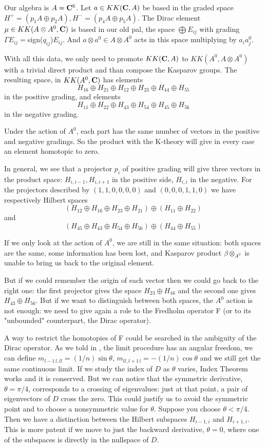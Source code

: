 \documentclass[a4paper,10pt]{article}
\begin{document}
Our algebra is $A={\bf C}^6$. Let $a \in KK({\bf C},A)$ be based in the graded space
$H^+=(p_1 A\oplus p_2A), H^-=(p_4A\oplus p_5A)$. The Dirac element 
$\mu \in KK(A\otimes A^0,{\bf C})$ is based in our old pal\cite{previous}, the 
space $\bigoplus E_{ij}$ with grading $\Gamma E_{ij}=$sign($q_{ij}$)$E_{ij}$.
And $a\otimes a^0 \in A\otimes A^0$ acts in this space
multiplying by $a_i a^0_j$.

With all this data, we only need to promote $KK({\bf C},A)$ to 
$KK(A^0, A\otimes A^0)$ with a trivial direct product and than compose
the Kasparov groups. The resulting space, in $KK(A^0,{\bf C})$ has elements
$$H_{16}\oplus H_{21}\oplus H_{12}\oplus H_{23}\oplus H_{44} \oplus H_{55}
$$ in the positive grading, and elements
$$H_{11}\oplus H_{22}\oplus H_{43}\oplus H_{54}\oplus H_{45} \oplus H_{56}
$$ in the negative grading. 

Under the action of $A^0$, each part has the same number of vectors in the
positive and negative gradings. So the product with the K-theory will give
in every case an element homotopic to zero. 

In general, we see that a projector $p_i$ of positive grading will give three
vectors in the
product space: $H_{i,i-1}, H_{i,i+1}$ in the positive side, $H_{i,i}$ in the
negative. For the projectors described by $(1,1,0,0,0,0)$ and 
$(0,0,0,1,1,0) $ we have respectively Hilbert spaces
$$(H_{12}\oplus H_{16}\oplus H_{23}\oplus H_{21})\oplus (H_{11} \oplus H_{22})
$$ and 
$$(H_{45}\oplus H_{43}\oplus H_{54}\oplus H_{56}) \oplus (H_{44} \oplus H_{55})
$$  
 
If we only look at the action of $A^0$, we are still in the same 
situation: both spaces are the same, 
some information has been lost, and Kasparov product
$\beta \otimes_{A^0}$ is unable to bring us back to the original
element. 

But if we could remember the origin of each vector then
we could go back to the right one: the first projector gives the
space $H_{23}\oplus H_{16}$ and the second one gives 
      $H_{43}\oplus H_{56}$.  But if we want to distinguish between both
spaces, the $A^0$ action is not enough: we need to give again a role
to the Fredholm operator F (or to its "unbounded" counterpart, the
Dirac operator).


A way to restrict the homotopies of F could be searched in the ambiguity of the
Dirac operator. As we told in \cite{previous}, the limit procedure has
an angular freedom, we can define $m_{l-1\,l,ll}=(1/n) \sin \theta$,
$m_{ll,l+1\,l}=- (1/n) \cos\theta$ and we still get the same continuous
limit. If we study the index of $D$ as $\theta$ varies, Index Theorem works
and it is conserved. But we can notice that the symmetric derivative,
$\theta=\pi/4$, corresponds to a crossing of eigenvalues: just at that
point, a pair of eigenvectors of $D$ cross the zero. This could justify us
to avoid the symmetric point and to choose a nonsymmetric value for $\theta$.
Suppose you choose $\theta< \pi/4$. Then we have a distinction between the
Hilbert subspaces $H_{i-1,i}$ and $H_{i+1,i}$. This is more patent if 
we move to just the backward derivative, $\theta=0$, where one of the
subspaces is directly in the nullspace of $D$.
\end{document}
